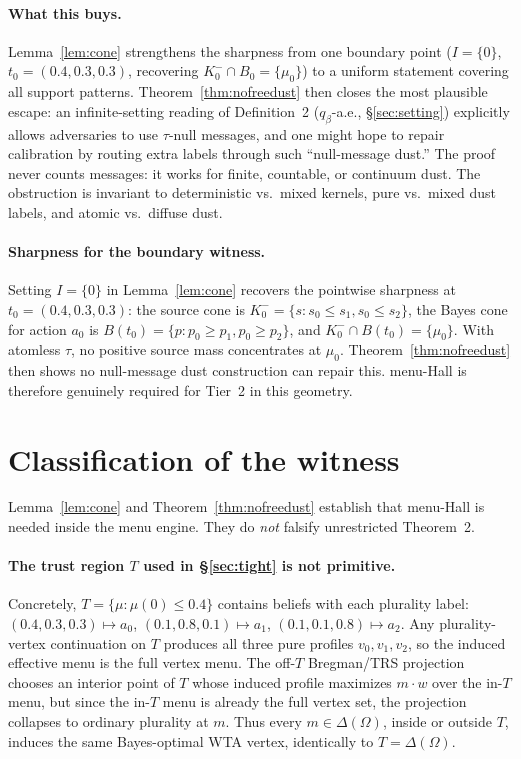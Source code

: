 \documentclass[11pt]{article}
\theoremstyle{definition}
\theoremstyle{remark}
\newcommand{\Om}{\Omega}
\begin{document}
\paragraph{What this buys.} Lemma~\ref{lem:cone} strengthens the
sharpness from one boundary point ($I = \{0\}$, $t_0 =
(0.4,0.3,0.3)$, recovering $K_0^- \cap B_0 = \{\mu_0\}$) to a uniform
statement covering all support patterns. Theorem~\ref{thm:nofreedust}
then closes the most plausible escape: an infinite-setting reading of
Definition~2 ($q_\beta$-a.e., \S\ref{sec:setting}) explicitly allows
adversaries to use $\tau$-null messages, and one might hope to repair
calibration by routing extra labels through such ``null-message
dust.'' The proof never counts messages: it works for finite,
countable, or continuum dust. The obstruction is invariant to
deterministic vs.\ mixed kernels, pure vs.\ mixed dust labels, and
atomic vs.\ diffuse dust.

\paragraph{Sharpness for the boundary witness.} Setting $I = \{0\}$
in Lemma~\ref{lem:cone} recovers the pointwise sharpness at
$t_0 = (0.4, 0.3, 0.3)$: the source cone is $K_0^- = \{s : s_0\le s_1,
s_0\le s_2\}$, the Bayes cone for action $a_0$ is $B(t_0) = \{p :
p_0\ge p_1, p_0\ge p_2\}$, and $K_0^- \cap B(t_0) = \{\mu_0\}$. With
atomless $\tau$, no positive source mass concentrates at $\mu_0$.
Theorem~\ref{thm:nofreedust} then shows no null-message dust
construction can repair this. menu-Hall is therefore genuinely
required for Tier~2 in this geometry.

\section{Classification of the witness}\label{sec:classification}

Lemma~\ref{lem:cone} and Theorem~\ref{thm:nofreedust} establish that
menu-Hall is needed inside the menu engine. They do \emph{not}
falsify unrestricted Theorem~2.

\paragraph{The trust region $T$ used in \S\ref{sec:tight} is not
primitive.} Concretely, $T = \{\mu : \mu(0)\le 0.4\}$ contains beliefs
with each plurality label: $(0.4, 0.3, 0.3)\mapsto a_0$, $(0.1, 0.8,
0.1)\mapsto a_1$, $(0.1, 0.1, 0.8)\mapsto a_2$. Any plurality-vertex
continuation on $T$ produces all three pure profiles $v_0, v_1, v_2$,
so the induced effective menu is the full vertex menu. The off-$T$
Bregman/TRS projection chooses an interior point of $T$ whose induced
profile maximizes $m\cdot w$ over the in-$T$ menu, but since the
in-$T$ menu is already the full vertex set, the projection collapses
to ordinary plurality at $m$. Thus every $m\in\Delta(\Om)$, inside or
outside $T$, induces the same Bayes-optimal WTA vertex, identically
to $T = \Delta(\Om)$.
\end{document}
